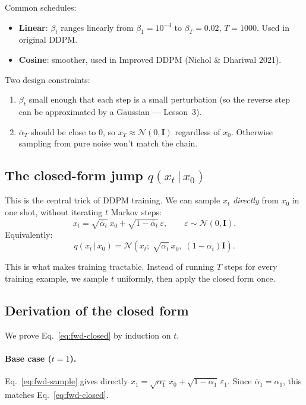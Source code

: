 \documentclass[11pt,a4paper]{article}
\newcommand{\N}{\mathcal{N}}
\newcommand{\given}{\,|\,}
\newcommand{\eps}{\varepsilon}
\begin{document}
Common schedules:
\begin{itemize}[leftmargin=*]
\item \textbf{Linear}: $\beta_t$ ranges linearly from $\beta_1 = 10^{-4}$ to $\beta_T = 0.02$, $T = 1000$. Used in original DDPM.
\item \textbf{Cosine}: smoother, used in Improved DDPM (Nichol \& Dhariwal 2021).
\end{itemize}
Two design constraints:
\begin{enumerate}[leftmargin=*]
\item $\beta_t$ small enough that each step is a small perturbation
  (so the reverse step can be approximated by a Gaussian --- Lesson~3).
\item $\bar{\alpha}_T$ should be close to $0$, so $x_T \approx \N(0,\mathbf{I})$
  regardless of $x_0$. Otherwise sampling from pure noise won't match
  the chain.
\end{enumerate}

\subsection{The closed-form jump $q(x_t \given x_0)$}

This is the central trick of DDPM training. We can sample $x_t$
\emph{directly} from $x_0$ in one shot, without iterating $t$ Markov
steps:
\begin{equation}
\boxed{\;
x_t = \sqrt{\bar{\alpha}_t}\, x_0 + \sqrt{1-\bar{\alpha}_t}\, \eps,
\qquad
\eps \sim \N(0, \mathbf{I}).\;}
\label{eq:fwd-closed}
\end{equation}
Equivalently:
\begin{equation}
q(x_t \given x_0) = \N(x_t;\; \sqrt{\bar{\alpha}_t}\, x_0,\; (1-\bar{\alpha}_t)\mathbf{I}).
\end{equation}

This is what makes training tractable. Instead of running $T$ steps for
every training example, we sample $t$ uniformly, then apply the closed
form once.

\subsection{Derivation of the closed form}

We prove Eq.~\eqref{eq:fwd-closed} by induction on $t$.

\paragraph{Base case ($t=1$).}
Eq.~\eqref{eq:fwd-sample} gives directly
$x_1 = \sqrt{\alpha_1}\, x_0 + \sqrt{1-\alpha_1}\,\eps_1$. Since
$\bar{\alpha}_1 = \alpha_1$, this matches Eq.~\eqref{eq:fwd-closed}. \checkmark
\end{document}
